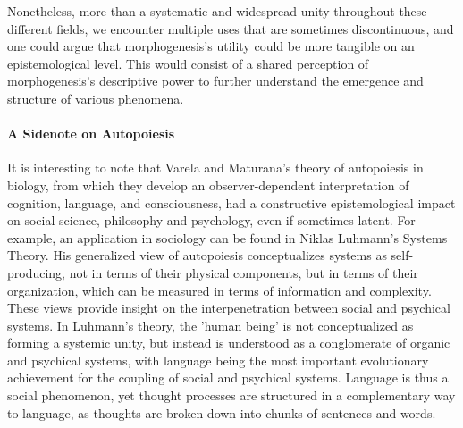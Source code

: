 \documentclass[fleqn,10pt]{wlscirep}
\begin{document}
Nonetheless, more than a systematic and widespread unity throughout these different fields, we encounter multiple uses that are sometimes discontinuous, and one could argue that morphogenesis’s utility could be more tangible on an epistemological level. This would consist of a shared perception of morphogenesis’s descriptive power to further understand the emergence and structure of various phenomena.

\paragraph*{A Sidenote on Autopoiesis}

It is interesting to note that Varela and Maturana’s theory of autopoiesis in biology, from which they develop an observer-dependent interpretation of cognition, language, and consciousness, had a constructive epistemological impact on social science, philosophy and psychology, even if sometimes latent. For example, an application in sociology can be found in Niklas Luhmann's Systems Theory. His generalized view of autopoiesis conceptualizes systems as self-producing, not in terms of their physical components, but in terms of their organization, which can be measured in terms of information and complexity\cite{gershenson_requisite_2014}. These views provide insight on the interpenetration between social and psychical systems. In Luhmann's theory, the 'human being' is not conceptualized as forming a systemic unity, but instead is understood as a conglomerate of organic and psychical systems, with language being the most important evolutionary achievement for the coupling of social and psychical systems. Language is thus a social phenomenon, yet thought processes are structured in a complementary way to language, as thoughts are broken down into chunks of sentences and words. \cite{seidl_luhmanns_2004}
\end{document}
